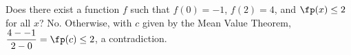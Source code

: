 {Does there exist a function $f$ such that $f(0)=-1$, $f(2)=4$, and $\fp(x)\le2$ for all $x$?}
{No.  Otherwise, with $c$ given by the Mean Value Theorem, $\dfrac{4--1}{2-0}=\fp(c)\le2$, a contradiction.}

